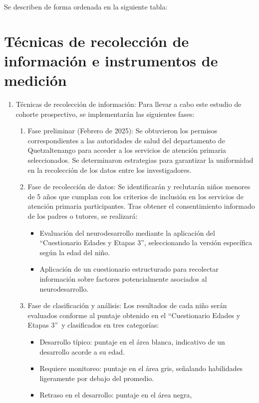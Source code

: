 \documentclass[11pt,letterpaper]{report}
\newcommand{\asq}{“Cuestionario Edades y Etapas 3”}
\begin{document}
Se describen de forma ordenada en la siguiente tabla:



\section{Técnicas de recolección de información e instrumentos de medición}
	\begin{enumerate}
		\item Técnicas de recolección de información: Para llevar a cabo este
		estudio de cohorte prospectivo, se implementarán las siguientes fases:
	\begin{enumerate}
		\item Fase preliminar (Febrero de 2025):
		Se obtuvieron los permisos correspondientes a las autoridades de salud
		del departamento de Quetzaltenango para acceder a los servicios de
		atención primaria seleccionados. Se determinaron estrategias para
		garantizar la uniformidad en la recolección de los datos entre los
		investigadores.
		\item Fase de recolección de datos:
		Se identificarán y reclutarán niños menores de 5 años que cumplan con
		los criterios de inclusión en los servicios de atención primaria
		participantes. Tras obtener el consentimiento informado de los padres o
		tutores, se realizará:
			\begin{itemize}
			\item Evaluación del neurodesarrollo mediante la aplicación del
			\asq, seleccionando la versión específica según la edad del niño.
			\item Aplicación de un cuestionario estructurado para recolectar
			información sobre factores potencialmente asociados al
			neurodesarrollo.
			\end{itemize}
		\item Fase de clasificación y análisis:
		Los resultados de cada niño serán evaluados conforme al puntaje obtenido
		en el \asq\ y clasificados en tres categorías:
			\begin{itemize}
			\item Desarrollo típico: puntaje en el área blanca, indicativo de
			un desarrollo acorde a su edad.
			\item Requiere monitoreo: puntaje en el área gris, señalando
			habilidades ligeramente por debajo del promedio.
			\item Retraso en el desarrollo: puntaje en el área negra,

\end{itemize}
\end{enumerate}
\end{enumerate}
\end{document}

